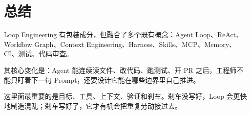 \documentclass[9pt,a4paper,twocolumn]{ctexart}
\begin{document}
\section*{总结}


Loop Engineering 有包装成分，但融合了多个既有概念：Agent Loop、ReAct、Workflow Graph、Context Engineering、Harness、Skills、MCP、Memory、CI、测试、代码审查。



其核心变化是：Agent 能连续读文件、改代码、跑测试、开 PR 之后，工程师不能只盯着下一句 Prompt，还要设计它能在哪些边界里自己推进。



这里面最重要的是目标、工具、上下文、验证和刹车。刹车没写好，Loop 会更快地制造混乱；刹车写好了，它才有机会把重复劳动接过去。
\end{document}
